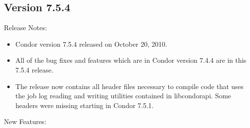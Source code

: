 \subsection*{\label{sec:New-7-5-4}Version 7.5.4}

\noindent Release Notes:

\begin{itemize}

\item Condor version 7.5.4 released on October 20, 2010.

\item All of the bug fixes and features which are in
Condor version 7.4.4 are in this 7.5.4 release.

\item The release now contains all header files necessary to compile
code that uses the job log reading and writing utilities contained
in libcondorapi. Some headers were missing starting in Condor 7.5.1.

\end{itemize}


\noindent New Features:

